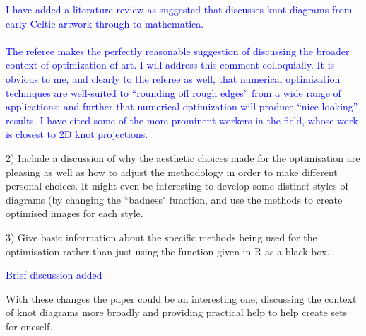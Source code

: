 \documentclass[12pt]{article}
\begin{document}
\textcolor{blue}{I have added a literature review as suggested that
  discusses knot diagrams from early Celtic artwork through to
  mathematica.\\ \\ The referee makes the perfectly reasonable
  suggestion of discussing the broader context of optimization of art.
  I will address this comment colloquially.  It is obvious to me, and
  clearly to the referee as well, that numerical optimization
  techniques are well-suited to ``rounding off rough edges'' from a
  wide range of applications; and further that numerical optimization
  will produce ``nice looking'' results.  I have cited some of the
  more prominent workers in the field, whose work is closest to 2D
  knot projections.}

2) Include a discussion of why the aesthetic choices made for the
optimisation are pleasing as well as how to adjust the methodology in
order to make different personal choices. It might even be interesting
to develop some distinct styles of diagrams (by changing the ``badness"
function, and use the methods to create optimised images for each
style.

3) Give basic information about the specific methods being used for
the optimisation rather than just using the function given in R as a
black box.


\textcolor{blue}{Brief discussion added}


With these changes the paper could be an interesting one, discussing
the context of knot diagrams more broadly and providing practical help
to help create sets for oneself.
\end{document}
